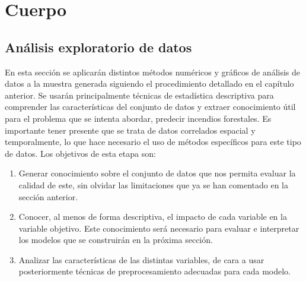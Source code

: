 \documentclass[12pt,a4paper,]{book}
\title{}
\author{Nombre Completo Autor}
\date{18/11/2021}
\def\ifdoblecara{} %
\def\ifprincipal{} %
\let\ifprincipal\undefined %
\numberwithin{dummy}{section}
\theoremstyle{ocrenumbox}
\theoremstyle{blacknumex}
\theoremstyle{blacknumbox}
\theoremstyle{ocrenum}
\theoremstyle{ocrenum}
\begin{document}




\raggedbottom

\ifdefined\ifprincipal
\else
\setlength{\parindent}{1em}
\pagestyle{fancy}
\setcounter{tocdepth}{4}
\tableofcontents

\fi

\ifdefined\ifdoblecara
\fancyhead{}{}
\fancyhead[LE,RO]{\scriptsize\rightmark}
\fancyfoot[LO,RE]{\scriptsize\slshape \leftmark}
\fancyfoot[C]{}
\fancyfoot[LE,RO]{\footnotesize\thepage}
\else
\fancyhead{}{}
\fancyhead[RO]{\scriptsize\rightmark}
\fancyfoot[LO]{\scriptsize\slshape \leftmark}
\fancyfoot[C]{}
\fancyfoot[RO]{\footnotesize\thepage}
\fi

\renewcommand{\headrulewidth}{0.4pt}
\renewcommand{\footrulewidth}{0.4pt}

\hypertarget{cuerpo}{%
\chapter{Cuerpo}\label{cuerpo}}

\hypertarget{anuxe1lisis-exploratorio-de-datos}{%
\section{Análisis exploratorio de
datos}\label{anuxe1lisis-exploratorio-de-datos}}

En esta sección se aplicarán distintos métodos numéricos y gráficos de
análisis de datos a la muestra generada siguiendo el procedimiento
detallado en el capítulo anterior. Se usarán principalmente técnicas de
estadística descriptiva para comprender las características del conjunto
de datos y extraer conocimiento útil para el problema que se intenta
abordar, predecir incendios forestales. Es importante tener presente que
se trata de datos correlados espacial y temporalmente, lo que hace
necesario el uso de métodos específicos para este tipo de datos. Los
objetivos de esta etapa son:

\begin{enumerate}
\def\labelenumi{\arabic{enumi}.}
\item
  Generar conocimiento sobre el conjunto de datos que nos permita
  evaluar la calidad de este, sin olvidar las limitaciones que ya se han
  comentado en la sección anterior.
\item
  Conocer, al menos de forma descriptiva, el impacto de cada variable en
  la variable objetivo. Este conocimiento será necesario para evaluar e
  interpretar los modelos que se construirán en la próxima sección.
\item
  Analizar las características de las distintas variables, de cara a
  usar posteriormente técnicas de preprocesamiento adecuadas para cada
  modelo.
\end{enumerate}
\end{document}
